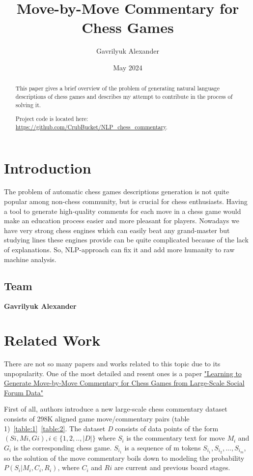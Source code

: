 \documentclass{article}
\title{Move-by-Move Commentary for Chess Games}
\author{Gavrilyuk Alexander}
\date{May 2024}
\begin{document}
\maketitle
\begin{abstract}
    This paper gives a brief overview of the problem of generating natural language descriptions of chess games and describes my attempt to contribute in the process of solving it.
    
    Project code is located here: \url{https://github.com/CrubBucket/NLP_chess_commentary}.
\end{abstract}



\section{Introduction}
The problem of automatic chess games descriptions generation is not quite popular among non-chess community, but is crucial for chess enthusiasts. Having a tool to generate high-quality comments for each move in a chess game would make an education process easier and more pleasant for players. Nowadays we have very strong chess engines which can easily beat any grand-master but studying lines these engines provide can be quite complicated because of the lack of explanations. So, NLP-approach can fix it and add more humanity to raw machine analysis.
\subsection{Team}

\textbf{Gavrilyuk Alexander}



\section{Related Work}
\label{sec:related}
There are not so many papers and works related to this topic due to its unpopularity. One of the most detailed and resent ones is a paper \href{https://aclanthology.org/P18-1154/}{"Learning to Generate Move-by-Move Commentary for Chess Games from Large-Scale Social Forum Data"}\cite{article}

First of all, authors introduce a new large-scale chess commentary dataset consists of 298K aligned game move/commentary pairs (table 1)~\ref{table:1}~\ref{table:2}. The dataset \textit{D} consists of data points of the form $(Si, Mi, Gi), i \in \{1, 2, .., |D|\}$ where $S_i$ is the commentary text for move $M_i$ and $G_i$ is the corresponding chess game. $S_{i_1}$ is a sequence of m tokens $S_{i_1}, S_{i_2}, ..., S_{i_m}$, so the solution of the move commentary boils down to modeling the probability $P(S_i|M_i, C_i, R_i)$, where $C_i$ and $Ri$ are current and previous board stages.
\end{document}
